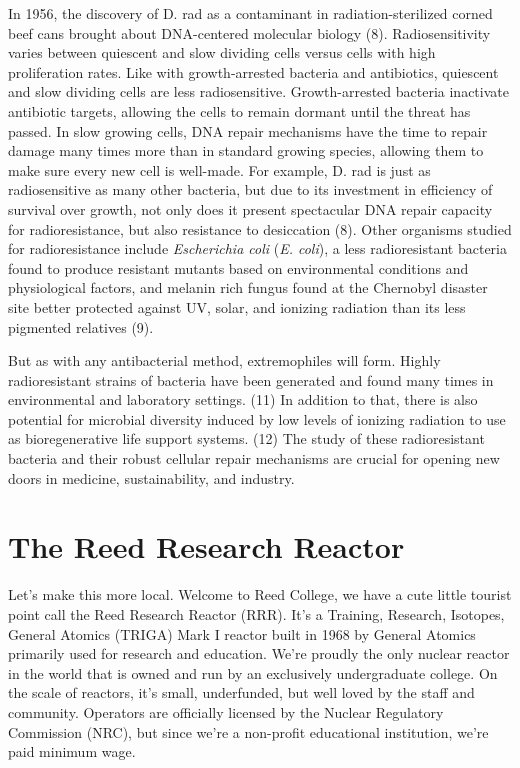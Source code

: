 \documentclass[12pt,twoside]{reedthesis}
\begin{document}
In 1956, the discovery of D. rad as a contaminant in radiation-sterilized corned beef cans brought about DNA-centered molecular biology (8). Radiosensitivity varies between quiescent and slow dividing cells versus cells with high proliferation rates. Like with growth-arrested bacteria and antibiotics, quiescent and slow dividing cells are less radiosensitive. Growth-arrested bacteria inactivate antibiotic targets, allowing the cells to remain dormant until the threat has passed. In slow growing cells, DNA repair mechanisms have the time to repair damage many times more than in standard growing species, allowing them to make sure every new cell is well-made. For example, D. rad is just as radiosensitive as many other bacteria, but due to its investment in efficiency of survival over growth, not only does it present spectacular DNA repair capacity for radioresistance, but also resistance to desiccation (8). Other organisms studied for radioresistance include \emph{Escherichia coli} (\emph{E. coli}), a less radioresistant bacteria found to produce resistant mutants based on environmental conditions and physiological factors, and melanin rich fungus found at the Chernobyl disaster site better protected against UV, solar, and ionizing radiation than its less pigmented relatives (9).

But as with any antibacterial method, extremophiles will form. Highly radioresistant strains of bacteria have been generated and found many times in environmental and laboratory settings. (11) In addition to that, there is also potential for microbial diversity induced by low levels of ionizing radiation to use as bioregenerative life support systems. (12) The study of these radioresistant bacteria and their robust cellular repair mechanisms are crucial for opening new doors in medicine, sustainability, and industry.

\hypertarget{the-reed-research-reactor}{%
\section{The Reed Research Reactor}\label{the-reed-research-reactor}}

Let's make this more local. Welcome to Reed College, we have a cute little tourist point call the Reed Research Reactor (RRR). It's a Training, Research, Isotopes, General Atomics (TRIGA) Mark I reactor built in 1968 by General Atomics primarily used for research and education. We're proudly the only nuclear reactor in the world that is owned and run by an exclusively undergraduate college. On the scale of reactors, it's small, underfunded, but well loved by the staff and community. Operators are officially licensed by the Nuclear Regulatory Commission (NRC), but since we're a non-profit educational institution, we're paid minimum wage.
\end{document}
